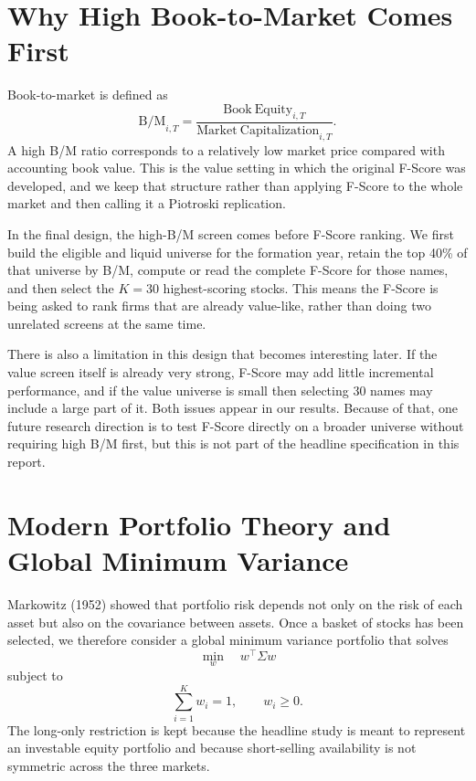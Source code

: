\documentclass[11pt,a4paper]{report}
\numberwithin{figure}{chapter}
\numberwithin{table}{chapter}
\numberwithin{equation}{chapter}
\begin{document}
\section{Why High Book-to-Market Comes First}
\label{sec:high_bm}

Book-to-market is defined as
\begin{equation}
\mathrm{B/M}_{i,T} = \frac{\mathrm{Book\ Equity}_{i,T}}{\mathrm{Market\ Capitalization}_{i,T}}.
\label{eq:bm}
\end{equation}
A high B/M ratio corresponds to a relatively low market price compared with accounting book value. This is the value setting in which the original F-Score was developed, and we keep that structure rather than applying F-Score to the whole market and then calling it a Piotroski replication.

In the final design, the high-B/M screen comes before F-Score ranking. We first build the eligible and liquid universe for the formation year, retain the top 40\% of that universe by B/M, compute or read the complete F-Score for those names, and then select the $K=30$ highest-scoring stocks. This means the F-Score is being asked to rank firms that are already value-like, rather than doing two unrelated screens at the same time.

There is also a limitation in this design that becomes interesting later. If the value screen itself is already very strong, F-Score may add little incremental performance, and if the value universe is small then selecting 30 names may include a large part of it. Both issues appear in our results. Because of that, one future research direction is to test F-Score directly on a broader universe without requiring high B/M first, but this is not part of the headline specification in this report.

\section{Modern Portfolio Theory and Global Minimum Variance}

Markowitz (1952) showed that portfolio risk depends not only on the risk of each asset but also on the covariance between assets. Once a basket of stocks has been selected, we therefore consider a global minimum variance portfolio that solves
\begin{equation}
\min_{w} \quad w^{\top}\Sigma w
\label{eq:gmv_objective}
\end{equation}
subject to
\begin{equation}
\sum_{i=1}^{K} w_i = 1, \qquad w_i \geq 0.
\label{eq:gmv_constraints}
\end{equation}
The long-only restriction is kept because the headline study is meant to represent an investable equity portfolio and because short-selling availability is not symmetric across the three markets.
\end{document}
